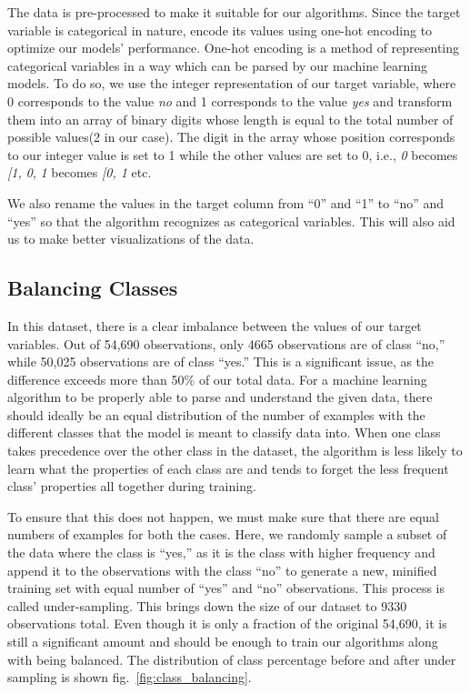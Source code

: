 \documentclass[runningheads]{llncs}
\begin{document}
The data is pre-processed to make it suitable for our algorithms. Since
the target variable is categorical in nature, encode its values using
one-hot encoding to optimize our models' performance. One-hot encoding
is a method of representing categorical variables in a way which can be
parsed by our machine learning models. To do so, we use the integer
representation of our target variable, where 0 corresponds to the value
\emph{no} and 1 corresponds to the value \emph{yes} and transform them
into an array of binary digits whose length is equal to the total number
of possible values(2 in our case). The digit in the array whose position
corresponds to our integer value is set to 1 while the other values are
set to 0, i.e., \emph{0} becomes \emph{{[}1, 0}, \emph{1} becomes
\emph{{[}0, 1} etc.

We also rename the values in the target column from ``0'' and ``1'' to
``no'' and ``yes'' so that the algorithm recognizes as categorical
variables. This will also aid us to make better visualizations of the
data.

\hypertarget{balancing-classes}{%
\subsection{Balancing Classes}\label{balancing-classes}}

In this dataset, there is a clear imbalance between the values of our
target variables. Out of 54,690 observations, only 4665 observations are
of class ``no,'' while 50,025 observations are of class ``yes.'' This is
a significant issue, as the difference exceeds more than 50\% of our
total data. For a machine learning algorithm to be properly able to
parse and understand the given data, there should ideally be an equal
distribution of the number of examples with the different classes that
the model is meant to classify data into. When one class takes
precedence over the other class in the dataset, the algorithm is less
likely to learn what the properties of each class are and tends to
forget the less frequent class' properties all together during training.

To ensure that this does not happen, we must make sure that there are
equal numbers of examples for both the cases. Here, we randomly sample a
subset of the data where the class is ``yes,'' as it is the class with
higher frequency and append it to the observations with the class ``no''
to generate a new, minified training set with equal number of ``yes''
and ``no'' observations. This process is called under-sampling. This
brings down the size of our dataset to 9330 observations total. Even
though it is only a fraction of the original 54,690, it is still a
significant amount and should be enough to train our algorithms along
with being balanced. The distribution of class percentage before and
after under sampling is shown fig.~\ref{fig:class_balancing}.
\end{document}
